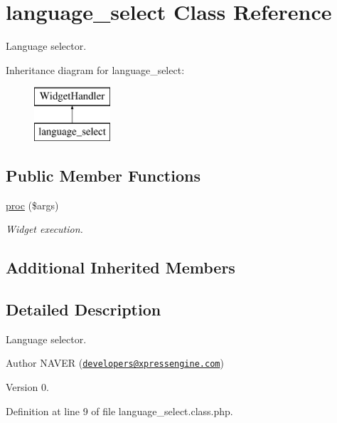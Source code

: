 \hypertarget{classlanguage__select}{}\section{language\+\_\+select Class Reference}
\label{classlanguage__select}


Language selector.  


Inheritance diagram for language\+\_\+select\+:\begin{figure}[H]
\begin{center}
\leavevmode
\includegraphics[height=2.000000cm]{classlanguage__select}
\end{center}
\end{figure}
\subsection*{Public Member Functions}
\begin{DoxyCompactItemize}
\item 
\hyperlink{classlanguage__select_a6c93581389af6a3ca6d149d384196479}{proc} (\$args)
\begin{DoxyCompactList}\small\item\em Widget execution. \end{DoxyCompactList}\end{DoxyCompactItemize}
\subsection*{Additional Inherited Members}


\subsection{Detailed Description}
Language selector. 

\begin{DoxyAuthor}{Author}
N\+A\+V\+ER (\href{mailto:developers@xpressengine.com}{\tt developers@xpressengine.\+com}) 
\end{DoxyAuthor}
\begin{DoxyVersion}{Version}
0. 
\end{DoxyVersion}


Definition at line 9 of file language\+\_\+select.\+class.\+php.



